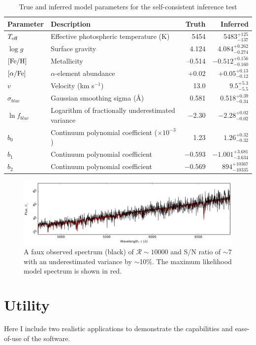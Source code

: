 \documentclass{aastex}
\begin{document}
\begin{table}
\caption{True and inferred model parameters for the self-consistent inference test}
\label{tab:inference-test}
\begin{tabular}{llrr}
\hline
\hline
Parameter & Description & Truth & Inferred \\
\hline
$T_{\rm eff}$ & Effective photospheric temperature (K) & 5454 & 5483$_{-137}^{+125}$ \\
$\log{}g$ & Surface gravity & 4.124 & 4.084$_{-0.274}^{+0.262}$ \\
${\rm [Fe/H]}$  & Metallicity & --0.514 & $-0.512_{-0.160}^{+0.156}$ \\
$[\alpha/{\rm Fe}]$ & $\alpha$-element abundance & $+0.02$ & $+0.05_{-0.12}^{+0.13}$ \\
$v$     & Velocity (km s$^{-1}$) & 13.0 & $9.5_{-5.5}^{+5.3}$ \\
$\sigma_{blue}$ & Gaussian smoothing sigma (\AA{}) & 0.581 & 0.518$_{-0.34}^{+0.39}$ \\
$\ln{f_{blue}}$ & Logarithm of fractionally underestimated variance & $-2.30$ & $-2.28_{-0.02}^{+0.02}$ \\
$b_{0}$ & Continuum polynomial coefficient ($\times10^{-3}$) & 1.23 & $1.26_{-0.32}^{+0.32}$ \\
$b_{1}$ & Continuum polynomial coefficient & $-0.593$ & $-1.001_{-3.634}^{+3.681}$ \\
$b_{2}$ & Continuum polynomial coefficient & $-0.569$ & $894_{-10335}^{+10367}$ \\
\hline
\end{tabular}
\end{table}

\begin{figure}
\label{fig:spectrum-inference}
\includegraphics[width=\textwidth]{spectrum.pdf}
\caption{A faux observed spectrum (black) of $\mathcal{R} \sim 10000$ and S/N 
ratio of $\sim7$ with an underestimated variance by $\sim$10\%. The maximum 
likelihood model spectrum is shown in red. }
\end{figure}

\section{Utility}
\label{sec:examples}
Here I include two realistic applications to demonstrate the capabilities and 
ease-of-use of the software.
 
\end{document}
